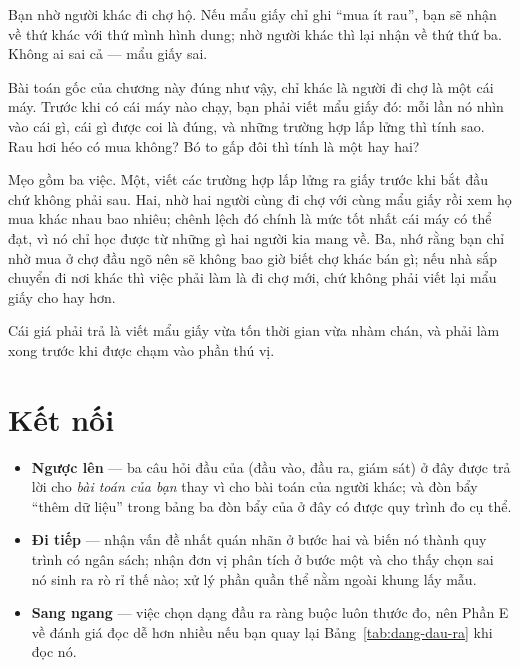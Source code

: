 \documentclass[../../deep_learning.tex]{subfiles}
\begin{document}
\begin{dongian}
Bạn nhờ người khác đi chợ hộ. Nếu mẩu giấy chỉ ghi ``mua ít rau'', bạn sẽ nhận về thứ khác với thứ mình hình dung; nhờ người khác thì lại nhận về thứ thứ ba. Không ai sai cả --- mẩu giấy sai.

Bài toán gốc của chương này đúng như vậy, chỉ khác là người đi chợ là một cái máy. Trước khi có cái máy nào chạy, bạn phải viết mẩu giấy đó: mỗi lần nó nhìn vào cái gì, cái gì được coi là đúng, và những trường hợp lấp lửng thì tính sao. Rau hơi héo có mua không? Bó to gấp đôi thì tính là một hay hai?

Mẹo gồm ba việc. Một, viết các trường hợp lấp lửng ra giấy trước khi bắt đầu chứ không phải sau. Hai, nhờ hai người cùng đi chợ với cùng mẩu giấy rồi xem họ mua khác nhau bao nhiêu; chênh lệch đó chính là mức tốt nhất cái máy có thể đạt, vì nó chỉ học được từ những gì hai người kia mang về. Ba, nhớ rằng bạn chỉ nhờ mua ở chợ đầu ngõ nên sẽ không bao giờ biết chợ khác bán gì; nếu nhà sắp chuyển đi nơi khác thì việc phải làm là đi chợ mới, chứ không phải viết lại mẩu giấy cho hay hơn.

Cái giá phải trả là viết mẩu giấy vừa tốn thời gian vừa nhàm chán, và phải làm xong trước khi được chạm vào phần thú vị.

\end{dongian}

\section{Kết nối}

\begin{itemize}
\item \textbf{Ngược lên} --- ba câu hỏi đầu của  (đầu vào, đầu ra, giám sát) ở đây được trả lời cho \emph{bài toán của bạn} thay vì cho bài toán của người khác; và đòn bẩy ``thêm dữ liệu'' trong bảng ba đòn bẩy của  ở đây có được quy trình đo cụ thể.
\item \textbf{Đi tiếp} ---  nhận vấn đề nhất quán nhãn ở bước hai và biến nó thành quy trình có ngân sách;  nhận đơn vị phân tích ở bước một và cho thấy chọn sai nó sinh ra rò rỉ thế nào;  xử lý phần quần thể nằm ngoài khung lấy mẫu.
\item \textbf{Sang ngang} --- việc chọn dạng đầu ra ràng buộc luôn thước đo, nên Phần E về đánh giá đọc dễ hơn nhiều nếu bạn quay lại Bảng~\ref{tab:dang-dau-ra} khi đọc nó.
\end{itemize}
\end{document}
